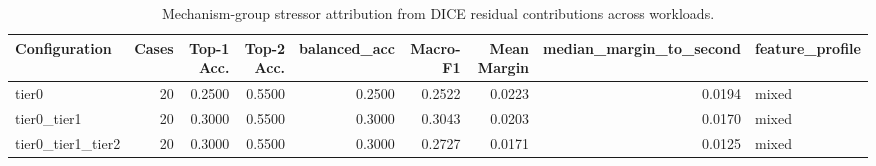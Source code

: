 \begin{table}[t]
\centering
\caption{Mechanism-group stressor attribution from DICE residual contributions across workloads.}
\label{tab:dice_stressor_diagnosis}
\footnotesize
\begin{tabular}{lrrrrrrrl}
\toprule
Configuration & Cases & Top-1 Acc. & Top-2 Acc. & balanced_acc & Macro-F1 & Mean Margin & median_margin_to_second & feature_profile \\
\midrule
tier0 & 20 & 0.2500 & 0.5500 & 0.2500 & 0.2522 & 0.0223 & 0.0194 & mixed \\
tier0_tier1 & 20 & 0.3000 & 0.5500 & 0.3000 & 0.3043 & 0.0203 & 0.0170 & mixed \\
tier0_tier1_tier2 & 20 & 0.3000 & 0.5500 & 0.3000 & 0.2727 & 0.0171 & 0.0125 & mixed \\
\bottomrule
\end{tabular}

\end{table}

